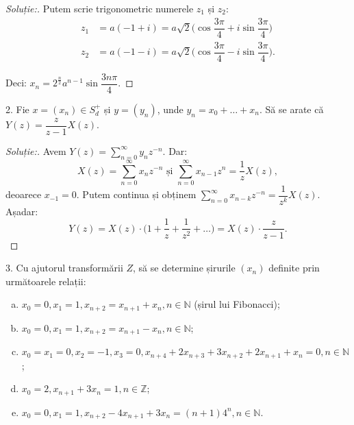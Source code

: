 \documentclass[12pt,a4paper]{article}
\theoremstyle{dotless}
\theoremstyle{dotlessdr}
\newenvironment{solution}
{\begin{proof}[Soluție:\nopunct]}
  {\end{proof}}
\begin{document}
\begin{solution}
Putem scrie trigonometric numerele $z_1$ și $z_2$:
\begin{align*}
z_1 &= a(-1 + i) = a \sqrt{2} \Big( \cos \dfrac{3\pi}{4} + 
i \sin \dfrac{3 \pi}{4} \Big) \\
z_2 &= a(-1 - i) = a \sqrt{2} \Big( \cos \dfrac{3 \pi}{4} - 
i \sin \dfrac{3 \pi}{4} \Big).
\end{align*}

Deci: $x_n = 2^{\frac{n}{2}} a^{n-1} \sin \dfrac{3 n \pi}{4}$.
\end{solution}


\vspace{1cm}

2. Fie $x = (x_n) \in S_d^+$ și $y = (y_n)$, unde $y_n = x_0 + \dots + x_n$. 
Să se arate că $Y(z) = \dfrac{z}{z-1} X(z)$.

\begin{solution}
Avem $Y(z) = \displaystyle\sum_{n=0}^\infty y_n z^{-n}.$ Dar: 
\[
X(z) = \sum_{n=0}^\infty x_n z^{-n} \text{ și } 
\sum_{n=0}^\infty x_{n-1} z^n = \dfrac{1}{z} X(z),
\]
deoarece $x_{-1} = 0$. Putem continua și obținem 
$\displaystyle\sum_{n=0}^\infty x_{n-k} z^{-n} = \dfrac{1}{z^k} X(z)$. Așadar: 
\[
Y(z) = X(z) \cdot \Big( 1 + \dfrac{1}{z} + \dfrac{1}{z^2} + \dots \Big) 
= X(z) \cdot \dfrac{z}{z-1}.
\]
\end{solution}

\vspace{1cm}

3. Cu ajutorul transformării $Z$, să se determine șirurile $(x_n)$ definite 
prin următoarele relații:
\begin{enumerate}[(a)]
\item $x_0 = 0, x_1 = 1, x_{n+2} = x_{n+1} + x_n, n \in \mathbb{N}$ 
(șirul lui Fibonacci);
\item $x_0 = 0, x_1 = 1, x_{n+2} = x_{n+1} - x_n, n \in \mathbb{N}$;
\item $x_0 = x_1 = 0, x_2 = -1, x_3 = 0, x_{n+4} + 
2x_{n+3} + 3 x_{n+2} + 2 x_{n+1} + x_n = 0, n \in \mathbb{N}$;
\item $x_0 = 2, x_{n+1} + 3x_n = 1, n \in \mathbb{Z}$;
\item $x_0 = 0, x_1 = 1, x_{n+2} - 4 x_{n+1} + 3x_n 
= (n+1)4^n, n \in \mathbb{N}$.
\end{enumerate}
\end{document}
